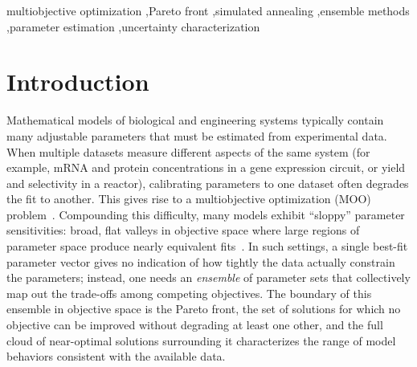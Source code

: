 \documentclass[preprint,review,12pt]{elsarticle}
\begin{document}
\begin{frontmatter}
\begin{abstract}
\textbf{Results:}
A controlled synthetic-data study reveals parameter identifiability structure, with individual rate constants off by several-fold yet model predictions accurate to 6--7\%.
A five-replicate coverage analysis confirms that timing features are reliably covered while peak amplitude is systematically overconfident.
Validation against published experimental thrombin generation data demonstrates that the ensemble predicts held-out conditions to within 1--10\% despite inherent model approximation error.

\textbf{Conclusions:}
By making ensemble generation lightweight and accessible, ParetoEnsembles.jl aims to lower the barrier to routine uncertainty characterization in mechanistic modeling.
The package is available under the MIT license at \url{https://github.com/varnerlab/ParetoEnsembles.jl}.
\end{abstract}

\begin{keyword}
multiobjective optimization \sep Pareto front \sep simulated annealing \sep ensemble methods \sep parameter estimation \sep uncertainty characterization
\end{keyword}

\end{frontmatter}

\linenumbers

\section{Introduction}\label{sec:intro}
Mathematical models of biological and engineering systems typically contain many adjustable parameters that must be estimated from experimental data. When multiple datasets measure different aspects of the same system (for example, mRNA and protein concentrations in a gene expression circuit, or yield and selectivity in a reactor), calibrating parameters to one dataset often degrades the fit to another. This gives rise to a multiobjective optimization (MOO) problem~\cite{Miettinen1999,Deb2001,CoelloCoello2007}. Compounding this difficulty, many models exhibit ``sloppy'' parameter sensitivities: broad, flat valleys in objective space where large regions of parameter space produce nearly equivalent fits~\cite{Gutenkunst2007}. In such settings, a single best-fit parameter vector gives no indication of how tightly the data actually constrain the parameters; instead, one needs an \emph{ensemble} of parameter sets that collectively map out the trade-offs among competing objectives. The boundary of this ensemble in objective space is the Pareto front, the set of solutions for which no objective can be improved without degrading at least one other, and the full cloud of near-optimal solutions surrounding it characterizes the range of model behaviors consistent with the available data.
\end{document}
